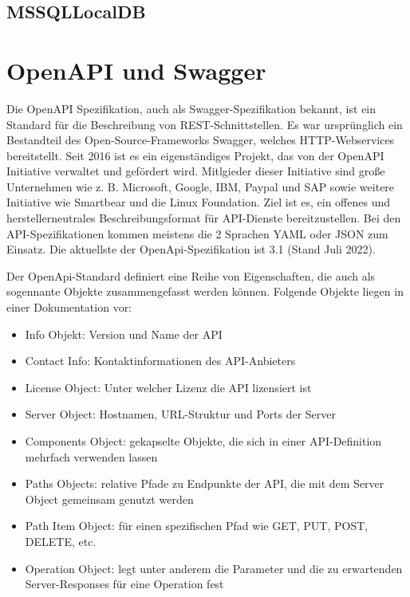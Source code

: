 \subsection{MSSQLLocalDB}


\section{OpenAPI und Swagger}
\cite{OpenAPISwaggerOfficial}
\cite{OpenAPISwaggerWikipedia}
\cite{OpenAPISwaggerIONOS}

Die OpenAPI Spezifikation, auch als Swagger-Spezifikation bekannt, ist ein Standard für die Beschreibung von 
REST-Schnittstellen. Es war ursprünglich ein Bestandteil des Open-Source-Frameworks Swagger, welches HTTP-Webservices bereitstellt.
Seit 2016 ist es ein eigenständiges Projekt, das von der OpenAPI Initiative verwaltet und gefördert wird. 
Mitlgieder dieser Initiative sind große Unternehmen wie z. B. Microsoft, Google, IBM, Paypal und SAP sowie weitere Initiative wie Smartbear und die Linux Foundation.
Ziel ist es, ein offenes und herstellerneutrales Beschreibungsformat für API-Dienste bereitzustellen. Bei den API-Spezifikationen kommen meistens die 2 Sprachen YAML oder JSON zum Einsatz. 
Die aktuellste der OpenApi-Spezifikation ist 3.1 (Stand Juli 2022). 

Der OpenApi-Standard definiert eine Reihe von Eigenschaften, die auch als sogennante Objekte zusammengefasst werden können. 
Folgende Objekte liegen in einer Dokumentation vor:
\begin{itemize}
    \item Info Objekt: Version und Name der API
    \item Contact Info: Kontaktinformationen des API-Anbieters
    \item License Object: Unter welcher Lizenz die API lizensiert ist
    \item Server Object: Hostnamen, URL-Struktur und Ports der Server
    \item Components Object: gekapselte Objekte, die sich in einer API-Definition mehrfach verwenden lassen
    \item Paths Objects: relative Pfade zu Endpunkte der API, die mit dem Server Object gemeinsam genutzt werden
    \item Path Item Object: für einen spezifischen Pfad wie GET, PUT, POST, DELETE, etc.
    \item Operation Object: legt unter anderem die Parameter und die zu erwartenden Server-Responses für eine Operation fest
\end{itemize}

